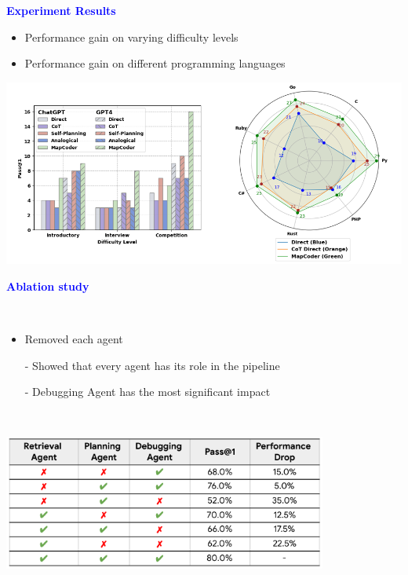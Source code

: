 \documentclass[professionalfont]{beamer}
\begin{document}
\begin{frame}
\begin{center}
    { \textbf{\textcolor{blue}{ {\fontsize{12}{14}\selectfont Experiment Results} }} }
\end{center}

{\fontsize{10}{14}\selectfont 
\begin{itemize}
    \item Performance gain on varying difficulty levels
    \item Performance gain on different programming languages
\end{itemize}
}

\begin{center}
    \includegraphics[width=1.0\textwidth]{figure6.png}
\end{center}

\end{frame}

\begin{frame}
\begin{center}
    { \textbf{\textcolor{blue}{ {\fontsize{12}{14}\selectfont Ablation study} }} }
\end{center}
\\[0.5cm]

{\fontsize{10}{14}\selectfont 
\begin{itemize}
    \item Removed each agent
    
    - Showed that every agent has its role in the pipeline

    - Debugging Agent has the most significant impact
\end{itemize}
}
\\[0.5cm]

\begin{center}
    \includegraphics[width=0.8\textwidth]{table6.png}
\end{center}

\end{frame}
\end{document}
